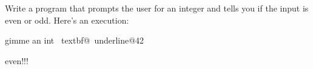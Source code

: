 Write a program that prompts the user for an integer and tells you if the input is even or odd. Here's an execution:

\begin{console}[commandchars=\~\@\$]

gimme an int ~textbf@~underline@42$$

even!!!

\end{console}


